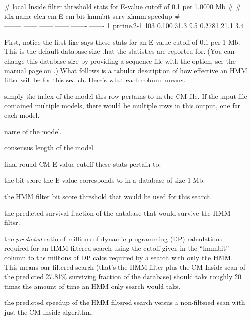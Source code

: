 
\begin{sreoutput}
# local Inside filter threshold stats for E-value cutoff of  0.1 per 1.0000 Mb
#
#  idx  name              clen      cm E  cm bit  hmmbit    surv     xhmm  speedup
# ----  ---------------  -----  --------  ------  ------  ------  -------  -------
     1  purine.2-1         103     0.100    31.3     9.5  0.2781     21.1      3.4
\end{sreoutput}

First, notice the first line says these stats for an E-value cutoff of
0.1 per 1 Mb. This is the default database size that the statistics are
reported for. (You can change this database size by providing a
sequence file with the  option, see the manual page on
.) What follows is a tabular description of how effective
an HMM filter will be for this search. Here's what each column means:

\begin{wideitem}

\item[\emprog{idx}] simply the index of the model this row pertains to in
  the CM file. If the input file  contained
  multiple models, there would be multiple rows in this output, one for
  each model.

\item[\emprog{name}] name of the model.

\item[\emprog{clen}] consensus length of the model

\item[\emprog{cm E}] final round CM E-value cutoff these stats pertain
  to.

\item[\emprog{cm bit}] the bit score the E-value corresponds to in a
  database of size 1 Mb.

\item[\emprog{hmm bit}] the HMM filter bit score threshold that would
  be used for this search.

\item[\emprog{surv}] the predicted survival fraction of the database
  that would survive the HMM filter.

\item[\emprog{xhmm}] the \emph{predicted} ratio of millions of dynamic programming (DP)
  calculations required for an HMM filtered search using the cutoff
  given in the ``hmmbit'' column to the millions of DP calcs required
  by a search with only the HMM. This means our filtered search
  (that's the HMM filter plus the CM Inside scan of the predicted
  27.81\% surviving fraction of the database) should take
  roughly 20 times the amount of time an HMM only search would take.
  
\item[\emprog{speedup}] the predicted speedup of the HMM filtered
  search versus a non-filtered scan with just the CM Inside algorithm.

\end{wideitem}

